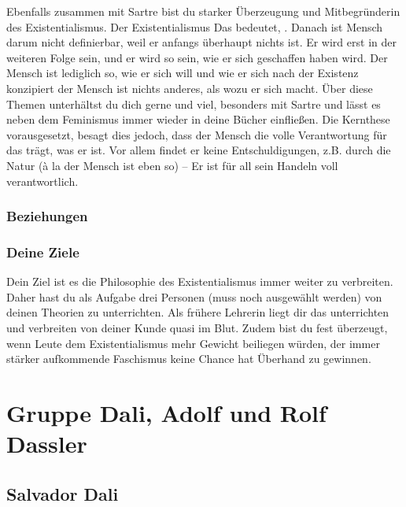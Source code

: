 \documentclass[12pt, a4paper, openany]{report}
\begin{document}
Ebenfalls zusammen mit Sartre bist du starker Überzeugung und Mitbegründerin des Existentialismus. Der Existentialismus  Das bedeutet, . Danach ist Mensch darum nicht definierbar, weil er anfangs überhaupt nichts ist. Er wird erst in der weiteren Folge sein, und er wird so sein, wie er sich geschaffen haben wird. Der Mensch ist lediglich so, wie er sich will und wie er sich nach der Existenz konzipiert der Mensch ist nichts anderes, als wozu er sich macht. Über diese Themen unterhältst du dich gerne und viel, besonders mit Sartre und lässt es neben dem Feminismus immer wieder in deine Bücher einfließen. Die Kernthese vorausgesetzt, besagt dies jedoch, dass der Mensch die volle Verantwortung für das trägt, was er ist. Vor allem findet er keine Entschuldigungen, z.B. durch die Natur (à la der Mensch ist eben so) – Er ist für all sein Handeln voll verantwortlich. 




\subsubsection{Beziehungen}

\subsubsection{Deine Ziele}

Dein Ziel ist es die Philosophie des Existentialismus immer weiter zu verbreiten. Daher hast du als Aufgabe drei Personen (muss noch ausgewählt werden) von deinen Theorien zu unterrichten. Als frühere Lehrerin liegt dir das unterrichten und verbreiten von deiner Kunde quasi im Blut. Zudem bist du fest überzeugt, wenn Leute dem Existentialismus mehr Gewicht beiliegen würden, der immer stärker aufkommende Faschismus keine Chance hat Überhand zu gewinnen. 

\section{Gruppe Dali, Adolf und Rolf Dassler}
\subsection{Salvador Dali}
\end{document}
